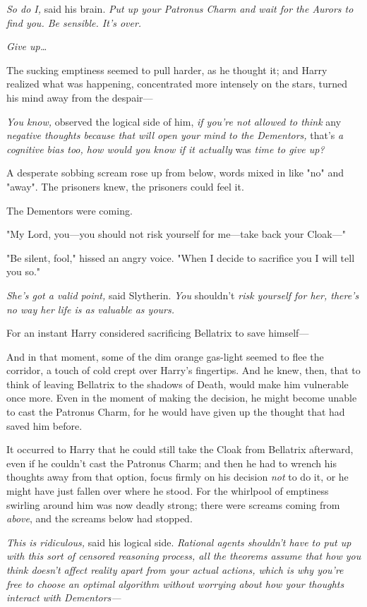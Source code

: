 \emph{So do I,} said his brain. \emph{Put up your Patronus Charm and wait for
the Aurors to find you. Be sensible. It's over.}

\emph{Give up…}

The sucking emptiness seemed to pull harder, as he thought it; and Harry
realized what was happening, concentrated more intensely on the stars, turned
his mind away from the despair---

\emph{You know,} observed the logical side of him, \emph{if you're not allowed
to think} any \emph{negative thoughts because that will open your mind to the
Dementors,} that's \emph{a cognitive bias too, how would you know if it
actually} was \emph{time to give up?}

A desperate sobbing scream rose up from below, words mixed in like "no" and
"away". The prisoners knew, the prisoners could feel it.

The Dementors were coming.

"My Lord, you---you should not risk yourself for me---take back your Cloak---"

"Be silent, fool," hissed an angry voice. "When I decide to sacrifice you I
will tell you so."

\emph{She's got a valid point,} said Slytherin. \emph{You} shouldn't \emph{risk
yourself for her, there's no way her life is as valuable as yours.}

For an instant Harry considered sacrificing Bellatrix to save himself---

And in that moment, some of the dim orange gas-light seemed to flee the
corridor, a touch of cold crept over Harry's fingertips. And he knew, then,
that to think of leaving Bellatrix to the shadows of Death, would make him
vulnerable once more. Even in the moment of making the decision, he might
become unable to cast the Patronus Charm, for he would have given up the
thought that had saved him before.

It occurred to Harry that he could still take the Cloak from Bellatrix
afterward, even if he couldn't cast the Patronus Charm; and then he had to
wrench his thoughts away from that option, focus firmly on his decision
\emph{not} to do it, or he might have just fallen over where he stood. For the
whirlpool of emptiness swirling around him was now deadly strong; there were
screams coming from \emph{above}, and the screams below had stopped.

\emph{This is ridiculous,} said his logical side. \emph{Rational agents
shouldn't have to put up with this sort of censored reasoning process, all the
theorems assume that how you think doesn't affect reality apart from your
actual actions, which is why you're free to choose an optimal algorithm without
worrying about how your thoughts interact with Dementors---}

